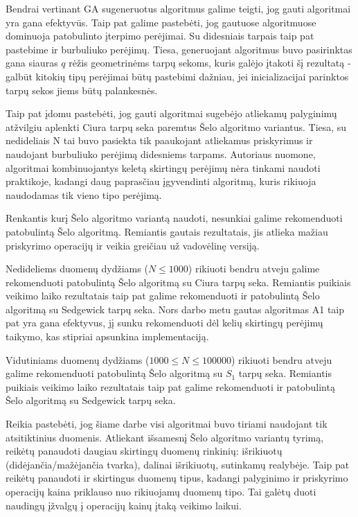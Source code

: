 \documentclass{VUMIFInfKursinis}
\begin{document}
Bendrai vertinant GA sugeneruotus algoritmus galime teigti, jog gauti algoritmai yra gana efektyvūs.
Taip pat galime pastebėti, jog gautuose algoritmuose dominuoja patobulinto įterpimo perėjimai.
Su didesniais tarpais taip pat pastebime ir burbuliuko perėjimų.
Tiesa, generuojant algoritmus buvo pasirinktas gana siauras $q$ rėžis geometrinėms tarpų sekoms, kuris galėjo įtakoti šį rezultatą -
galbūt kitokių tipų perėjimai būtų pastebimi dažniau, jei inicializacijai parinktos tarpų sekos jiems būtų palankesnės.

Taip pat įdomu pastebėti, jog gauti algoritmai sugebėjo atliekamų palyginimų atžvilgiu aplenkti Ciura tarpų seka paremtus Šelo algoritmo variantus.
Tiesa, su nedideliais N tai buvo pasiekta tik paaukojant atliekamus priskyrimus ir naudojant burbuliuko perėjimą didesniems tarpams.
Autoriaus nuomone, algoritmai kombinuojantys keletą skirtingų perėjimų nėra tinkami naudoti praktikoje,
kadangi daug paprasčiau įgyvendinti algoritmą, kuris rikiuoja naudodamas tik vieno tipo perėjimą.


Renkantis kurį Šelo algoritmo variantą naudoti, nesunkiai galime rekomenduoti patobulintą Šelo algoritmą.
Remiantis gautais rezultatais, jis atlieka mažiau priskyrimo operacijų ir veikia greičiau už vadovėlinę versiją.

Nedideliems duomenų dydžiams ($N \leq 1000$) rikiuoti bendru atveju galime rekomenduoti patobulintą Šelo algoritmą su Ciura tarpų seka.
Remiantis puikiais veikimo laiko rezultatais taip pat galime rekomenduoti ir patobulintą Šelo algoritmą su Sedgewick tarpų seka.
Nors darbo metu gautas algoritmas A1 taip pat yra gana efektyvus, jį sunku rekomenduoti dėl
kelių skirtingų perėjimų taikymo, kas stipriai apsunkina implementaciją.

Vidutiniams duomenų dydžiams ($1000 \leq N \leq 100000$) rikiuoti bendru atveju galime rekomenduoti patobulintą Šelo algoritmą su $S_1$ tarpų seka.
Remiantis puikiais veikimo laiko rezultatais taip pat galime rekomenduoti ir patobulintą Šelo algoritmą su Sedgewick tarpų seka.

Reikia pastebėti, jog šiame darbe visi algoritmai buvo tiriami naudojant tik atsitiktinius duomenis.
Atliekant išsamesnį Šelo algoritmo variantų tyrimą, reikėtų panaudoti daugiau skirtingų duomenų rinkinių:
išrikiuotų (didėjančia/mažėjančia tvarka), dalinai išrikiuotų, sutinkamų realybėje.
Taip pat reikėtų panaudoti ir skirtingus duomenų tipus, kadangi palyginimo ir priskyrimo operacijų kaina
priklauso nuo rikiuojamų duomenų tipo.
Tai galėtų duoti naudingų įžvalgų į operacijų kainų įtaką veikimo laikui.
\end{document}
